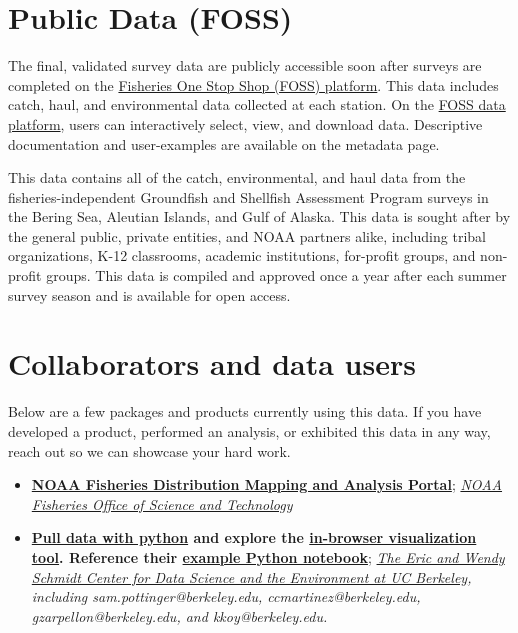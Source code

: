 \documentclass[
  letterpaper,
  oneside,
  open=any]{scrbook}
\begin{document}
\renewcommand*{\arraystretch}{1}

\part{Public Data (FOSS)}

The final, validated survey data are publicly accessible soon after
surveys are completed on the
\href{https://www.fisheries.noaa.gov/foss/}{Fisheries One Stop Shop
(FOSS) platform}. This data includes catch, haul, and environmental data
collected at each station. On the
\href{https://www.fisheries.noaa.gov/foss/}{FOSS data platform}, users
can interactively select, view, and download data. Descriptive
documentation and user-examples are available on the metadata page.

This data contains all of the catch, environmental, and haul data from
the fisheries-independent Groundfish and Shellfish Assessment Program
surveys in the Bering Sea, Aleutian Islands, and Gulf of Alaska. This
data is sought after by the general public, private entities, and NOAA
partners alike, including tribal organizations, K-12 classrooms,
academic institutions, for-profit groups, and non-profit groups. This
data is compiled and approved once a year after each summer survey
season and is available for open access.

\part{Collaborators and data users}

Below are a few packages and products currently using this data. If you
have developed a product, performed an analysis, or exhibited this data
in any way, reach out so we can showcase your hard work.

\begin{itemize}
\item
  \textbf{\href{https://apps-st.fisheries.noaa.gov/dismap}{NOAA
  Fisheries Distribution Mapping and Analysis Portal}};
  \emph{\href{https://www.fisheries.noaa.gov/contact/office-science-and-technology}{NOAA
  Fisheries Office of Science and Technology}}
\item
  \textbf{\href{https://pyafscgap.org/}{Pull data with python} and
  explore the
  \href{https://app.pyafscgap.org/\textquotesingle{}}{in-browser
  visualization tool}. Reference their
  \href{https://mybinder.org/v2/gh/SchmidtDSE/afscgap/main?urlpath=/tree/index.ipynb}{example
  Python notebook}}; \emph{\href{https://dse.berkeley.edu/}{The Eric and
  Wendy Schmidt Center for Data Science and the Environment at UC
  Berkeley}, including sam.pottinger@berkeley.edu,
  ccmartinez@berkeley.edu, gzarpellon@berkeley.edu, and
  kkoy@berkeley.edu.}
\end{itemize}
\end{document}
